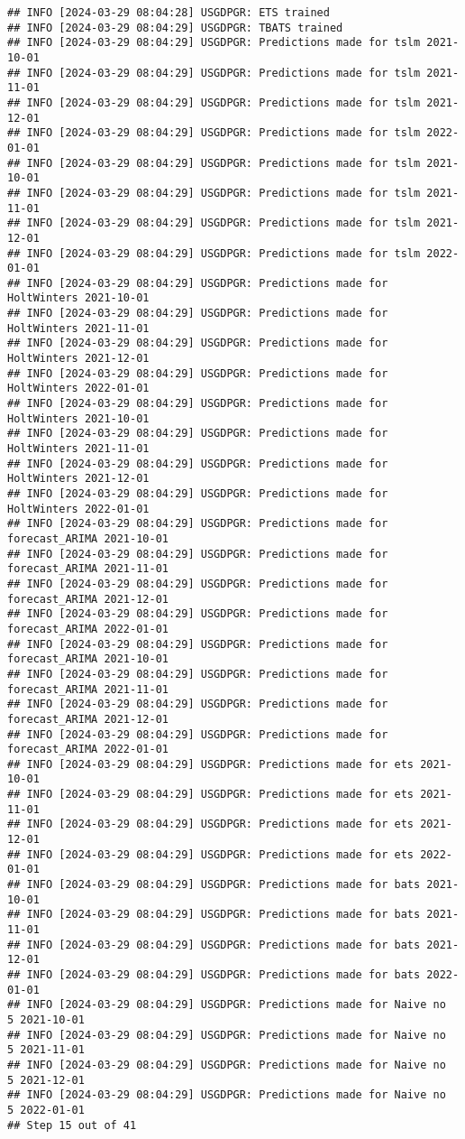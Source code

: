 \documentclass[
]{article}
\begin{document}
\begin{verbatim}
## INFO [2024-03-29 08:04:28] USGDPGR: ETS trained
## INFO [2024-03-29 08:04:29] USGDPGR: TBATS trained
## INFO [2024-03-29 08:04:29] USGDPGR: Predictions made for tslm 2021-10-01
## INFO [2024-03-29 08:04:29] USGDPGR: Predictions made for tslm 2021-11-01
## INFO [2024-03-29 08:04:29] USGDPGR: Predictions made for tslm 2021-12-01
## INFO [2024-03-29 08:04:29] USGDPGR: Predictions made for tslm 2022-01-01
## INFO [2024-03-29 08:04:29] USGDPGR: Predictions made for tslm 2021-10-01
## INFO [2024-03-29 08:04:29] USGDPGR: Predictions made for tslm 2021-11-01
## INFO [2024-03-29 08:04:29] USGDPGR: Predictions made for tslm 2021-12-01
## INFO [2024-03-29 08:04:29] USGDPGR: Predictions made for tslm 2022-01-01
## INFO [2024-03-29 08:04:29] USGDPGR: Predictions made for HoltWinters 2021-10-01
## INFO [2024-03-29 08:04:29] USGDPGR: Predictions made for HoltWinters 2021-11-01
## INFO [2024-03-29 08:04:29] USGDPGR: Predictions made for HoltWinters 2021-12-01
## INFO [2024-03-29 08:04:29] USGDPGR: Predictions made for HoltWinters 2022-01-01
## INFO [2024-03-29 08:04:29] USGDPGR: Predictions made for HoltWinters 2021-10-01
## INFO [2024-03-29 08:04:29] USGDPGR: Predictions made for HoltWinters 2021-11-01
## INFO [2024-03-29 08:04:29] USGDPGR: Predictions made for HoltWinters 2021-12-01
## INFO [2024-03-29 08:04:29] USGDPGR: Predictions made for HoltWinters 2022-01-01
## INFO [2024-03-29 08:04:29] USGDPGR: Predictions made for forecast_ARIMA 2021-10-01
## INFO [2024-03-29 08:04:29] USGDPGR: Predictions made for forecast_ARIMA 2021-11-01
## INFO [2024-03-29 08:04:29] USGDPGR: Predictions made for forecast_ARIMA 2021-12-01
## INFO [2024-03-29 08:04:29] USGDPGR: Predictions made for forecast_ARIMA 2022-01-01
## INFO [2024-03-29 08:04:29] USGDPGR: Predictions made for forecast_ARIMA 2021-10-01
## INFO [2024-03-29 08:04:29] USGDPGR: Predictions made for forecast_ARIMA 2021-11-01
## INFO [2024-03-29 08:04:29] USGDPGR: Predictions made for forecast_ARIMA 2021-12-01
## INFO [2024-03-29 08:04:29] USGDPGR: Predictions made for forecast_ARIMA 2022-01-01
## INFO [2024-03-29 08:04:29] USGDPGR: Predictions made for ets 2021-10-01
## INFO [2024-03-29 08:04:29] USGDPGR: Predictions made for ets 2021-11-01
## INFO [2024-03-29 08:04:29] USGDPGR: Predictions made for ets 2021-12-01
## INFO [2024-03-29 08:04:29] USGDPGR: Predictions made for ets 2022-01-01
## INFO [2024-03-29 08:04:29] USGDPGR: Predictions made for bats 2021-10-01
## INFO [2024-03-29 08:04:29] USGDPGR: Predictions made for bats 2021-11-01
## INFO [2024-03-29 08:04:29] USGDPGR: Predictions made for bats 2021-12-01
## INFO [2024-03-29 08:04:29] USGDPGR: Predictions made for bats 2022-01-01
## INFO [2024-03-29 08:04:29] USGDPGR: Predictions made for Naive no  5 2021-10-01
## INFO [2024-03-29 08:04:29] USGDPGR: Predictions made for Naive no  5 2021-11-01
## INFO [2024-03-29 08:04:29] USGDPGR: Predictions made for Naive no  5 2021-12-01
## INFO [2024-03-29 08:04:29] USGDPGR: Predictions made for Naive no  5 2022-01-01
## Step 15 out of 41
\end{verbatim}
\end{document}

